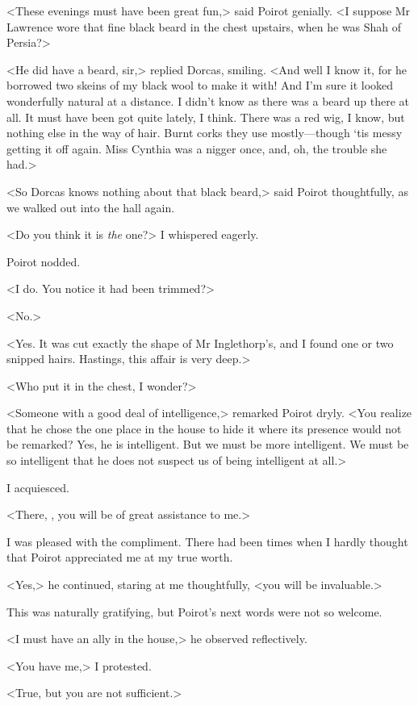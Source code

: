  <These evenings must have been great fun,> said Poirot genially. <I suppose Mr Lawrence wore that fine black beard in the chest upstairs, when he was Shah of Persia?> 

 <He did have a beard, sir,> replied Dorcas, smiling. <And well I know it, for he borrowed two skeins of my black wool to make it with! And I'm sure it looked wonderfully natural at a distance. I didn't know as there was a beard up there at all. It must have been got quite lately, I think. There was a red wig, I know, but nothing else in the way of hair. Burnt corks they use mostly—though ‘tis messy getting it off again. Miss Cynthia was a nigger once, and, oh, the trouble she had.> 

 <So Dorcas knows nothing about that black beard,> said Poirot thoughtfully, as we walked out into the hall again. 

 <Do you think it is \emph{the} one?> I whispered eagerly. 

 Poirot nodded. 

 <I do. You notice it had been trimmed?> 

 <No.> 

 <Yes. It was cut exactly the shape of Mr Inglethorp's, and I found one or two snipped hairs. Hastings, this affair is very deep.> 

 <Who put it in the chest, I wonder?> 

 <Someone with a good deal of intelligence,> remarked Poirot dryly. <You realize that he chose the one place in the house to hide it where its presence would not be remarked? Yes, he is intelligent. But we must be more intelligent. We must be so intelligent that he does not suspect us of being intelligent at all.> 

 I acquiesced. 

 <There, , you will be of great assistance to me.> 

 I was pleased with the compliment. There had been times when I hardly thought that Poirot appreciated me at my true worth. 

 <Yes,> he continued, staring at me thoughtfully, <you will be invaluable.> 

 This was naturally gratifying, but Poirot's next words were not so welcome. 

 <I must have an ally in the house,> he observed reflectively. 

 <You have me,> I protested. 

 <True, but you are not sufficient.> 

